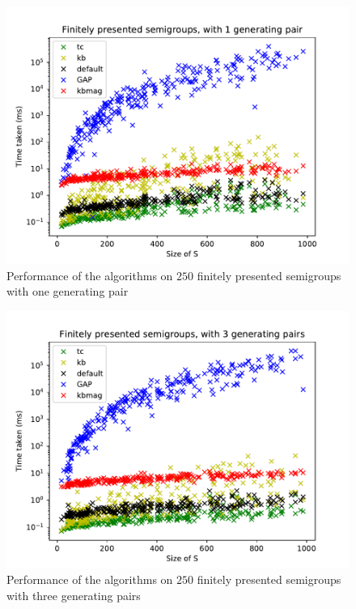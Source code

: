 \begin{figure}[p]
  \centering
  \includegraphics[width=\textwidth]{pics/ch-pairs/bench-fp-1p-times}
  \caption[Benchmark: all algorithms, finitely presented, 1 pair]
  {Performance of the algorithms on $250$ finitely presented semigroups
    with one generating pair}
  \label{fig:bench-fp-1p-times}
\end{figure}

\begin{figure}[p]
  \centering
  \includegraphics[width=\textwidth]{pics/ch-pairs/bench-fp-3p-times}
  \caption[Benchmark: all algorithms, finitely presented, 3 pairs]
  {Performance of the algorithms on $250$ finitely presented semigroups
    with three generating pairs}
  \label{fig:bench-fp-3p-times}
\end{figure}

